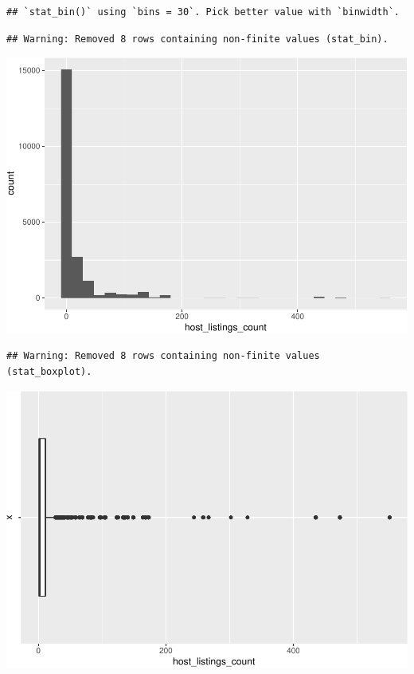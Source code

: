 \begin{verbatim}
## `stat_bin()` using `bins = 30`. Pick better value with `binwidth`.
\end{verbatim}

\begin{verbatim}
## Warning: Removed 8 rows containing non-finite values (stat_bin).
\end{verbatim}

\includegraphics{anal_files/figure-latex/unnamed-chunk-9-6.pdf}

\begin{verbatim}
## Warning: Removed 8 rows containing non-finite values (stat_boxplot).
\end{verbatim}

\includegraphics{anal_files/figure-latex/unnamed-chunk-9-7.pdf}

